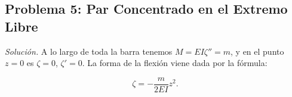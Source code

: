 \documentclass{article}
\begin{document}
\subsection*{Problema 5: Par Concentrado en el Extremo Libre}

\textit{Solución.} A lo largo de toda la barra tenemos $M = EI\zeta'' = m$, y en el punto $z = 0$ es $\zeta = 0$, $\zeta' = 0$. La forma de la flexión viene dada por la fórmula:

$$
\zeta = -\frac{m}{2EI} z^2.
$$
\end{document}
